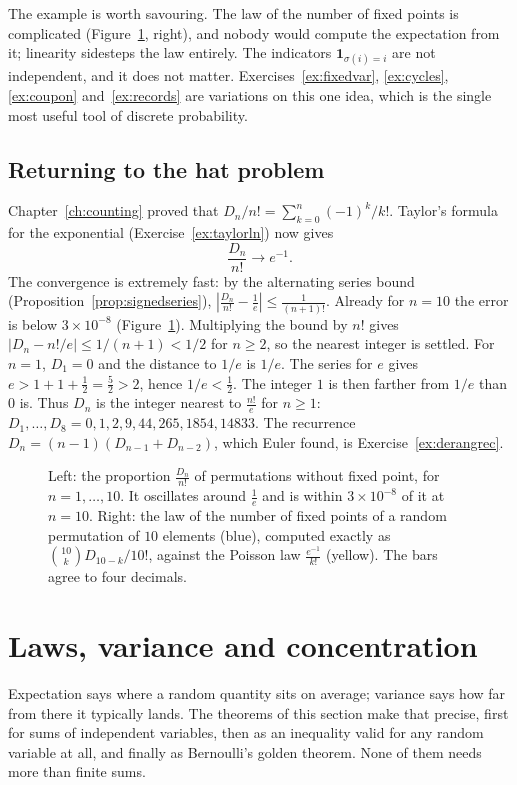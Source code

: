 The example is worth savouring. The law of the number of fixed points is complicated (Figure~\ref{fig:derang}, right), and nobody would compute the expectation from it; linearity sidesteps the law entirely. The indicators $\mathbf 1_{\sigma(i)=i}$ are not independent, and it does not matter. Exercises~\ref{ex:fixedvar}, \ref{ex:cycles}, \ref{ex:coupon} and~\ref{ex:records} are variations on this one idea, which is the single most useful tool of discrete probability.

\subsection*{Returning to the hat problem}
Chapter~\ref{ch:counting} proved that $D_n/n!=\sum_{k=0}^n(-1)^k/k!$. Taylor's formula for the exponential (Exercise~\ref{ex:taylorln}) now gives
\[\frac{D_n}{n!}\longrightarrow e^{-1}.\]
The convergence is extremely fast: by the alternating series bound (Proposition~\ref{prop:signedseries}), $\left|\frac{D_n}{n!}-\frac1e\right|\le\frac1{(n+1)!}$. Already for $n=10$ the error is below $3\times10^{-8}$ (Figure~\ref{fig:derang}). Multiplying the bound by $n!$ gives $|D_n-n!/e|\le1/(n+1)<1/2$ for $n\ge2$, so the nearest integer is settled. For $n=1$, $D_1=0$ and the distance to $1/e$ is $1/e$. The series for $e$ gives $e>1+1+\frac12=\frac52>2$, hence $1/e<\frac12$. The integer $1$ is then farther from $1/e$ than $0$ is. Thus $D_n$ is the integer nearest to $\frac{n!}e$ for $n\ge1$: $D_1,\dots,D_8=0,1,2,9,44,265,1854,14833$. The recurrence $D_n=(n-1)(D_{n-1}+D_{n-2})$, which Euler found, is Exercise~\ref{ex:derangrec}.

\begin{figure}[ht]
\centering
{}
\caption{Left: the proportion $\frac{D_n}{n!}$ of permutations without fixed point, for $n=1,\dots,10$. It oscillates around $\frac1e$ and is within $3\times10^{-8}$ of it at $n=10$. Right: the law of the number of fixed points of a random permutation of $10$ elements (blue), computed exactly as $\binom{10}kD_{10-k}/10!$, against the Poisson law $\frac{e^{-1}}{k!}$ (yellow). The bars agree to four decimals.}
\label{fig:derang}
\end{figure}

\section{Laws, variance and concentration}

Expectation says where a random quantity sits on average; variance says how far from there it typically lands. The theorems of this section
make that precise, first for sums of independent variables, then as an inequality valid for any random variable at all, and finally as Bernoulli's
golden theorem. None of them needs more than finite sums.

